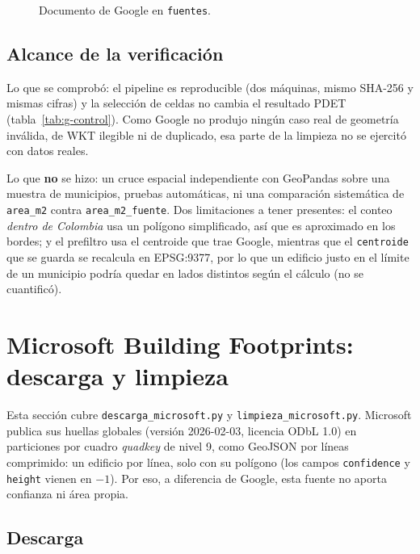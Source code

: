 \documentclass[11pt,a4paper]{article}
\newcommand{\campo}[1]{\texttt{#1}}
\begin{document}
\begin{figure}[H]
  \centering
  \caption{Documento de Google en \campo{fuentes}.}
  \label{fig:g-fuentes}
\end{figure}

\subsection{Alcance de la verificación}
\label{sec:g-limites}

Lo que se comprobó: el pipeline es reproducible (dos máquinas, mismo SHA-256 y
mismas cifras) y la selección de celdas no cambia el resultado PDET
(tabla~\ref{tab:g-control}). Como Google no produjo ningún caso real de
geometría inválida, de WKT ilegible ni de duplicado, esa parte de la limpieza
no se ejercitó con datos reales.

Lo que \textbf{no} se hizo: un cruce espacial independiente con GeoPandas
sobre una muestra de municipios, pruebas automáticas, ni una comparación
sistemática de \campo{area\_m2} contra \campo{area\_m2\_fuente}. Dos
limitaciones a tener presentes: el conteo \emph{dentro de Colombia} usa un
polígono simplificado, así que es aproximado en los bordes; y el prefiltro usa
el centroide que trae Google, mientras que el \campo{centroide} que se guarda se
recalcula en EPSG:9377, por lo que un edificio justo en el límite de un
municipio podría quedar en lados distintos según el cálculo (no se cuantificó).

\section{Microsoft Building Footprints: descarga y limpieza}
\label{sec:microsoft}

Esta sección cubre \campo{descarga\_microsoft.py} y
\campo{limpieza\_microsoft.py}. Microsoft publica sus huellas globales
(versión 2026-02-03, licencia ODbL 1.0) en particiones por cuadro
\emph{quadkey} de nivel 9, como GeoJSON por líneas comprimido: un edificio por
línea, solo con su polígono (los campos \campo{confidence} y \campo{height}
vienen en $-1$). Por eso, a diferencia de Google, esta fuente no aporta
confianza ni área propia.

\subsection{Descarga}
\label{sec:ms-descarga}
\end{document}

